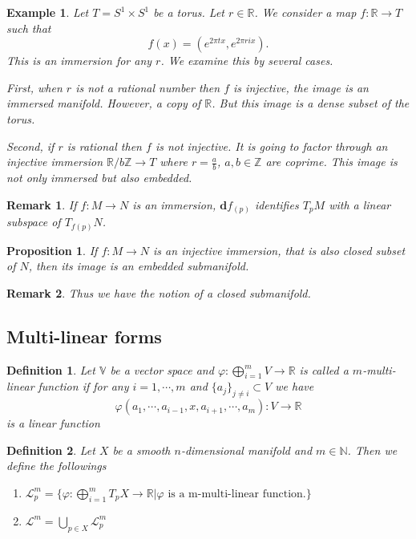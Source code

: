 \documentclass{article}
\newtheorem{proposition}{Proposition}[section]
\newtheorem{definition}{Definition}[section]
\newtheorem{remark}{Remark}[section]
\newtheorem{example}{Example}[section]
\numberwithin{equation}{section}
\begin{document}
\begin{example}
Let $T=S^1\times S^1$ be a torus. Let $r\in\mathbb{R}$. We consider a map $f:\mathbb{R}\to T$ such that
\begin{equation*}
f(x) = (e^{2\pi t x},e^{2\pi ri x}).
\end{equation*}
This is an immersion for any $r$. We examine this by several cases. \\
\par First, when $r$ is not a rational number then $f$ is injective, the image is an immersed manifold. However, a copy of $\mathbb{R}$. But this image is a dense subset of the torus. \\
\par Second, if $r$ is rational then $f$ is not injective. It is going to factor through an injective immersion $\mathbb{R}/b\mathbb{Z}\to T$ where $r={\frac a b}$, $a,b\in\mathbb{Z}$ are coprime. This image is not only immersed but also embedded. \\
\end{example}

\begin{remark}
If $f:M\to N$ is an immersion, $\mathbf{d}f_(p)$ identifies $T_pM$ with a linear subspace of $T_{f(p)}N$. 
\end{remark}

\begin{proposition}
If $f:M\to N$ is an injective immersion, that is also closed subset of $N$, then its image is an embedded submanifold. 
\end{proposition}

\begin{remark}
Thus we have the notion of a closed submanifold. 
\end{remark}

\subsection{Multi-linear forms}
\begin{definition}
Let $\mathbb{V}$ be a vector space and $\varphi:\bigoplus_{i=1}^mV\to\mathbb{R}$ is called a $m$-multi-linear function if for any $i=1,\cdots,m$ and $\{a_j\}_{j\not=i}\subset V$ we have
\begin{equation*}
\varphi(a_1,\cdots,a_{i-1},x,a_{i+1},\cdots,a_m):V\to\mathbb{R}
\end{equation*}
is a linear function
\end{definition}

\begin{definition}
Let $X$ be a smooth $n$-dimensional manifold and $m\in\mathbb{N}$. Then we define the followings
\begin{enumerate}
\item $\mathcal{L}^m_p=\{\varphi:\bigoplus_{i=1}^mT_pX\to\mathbb{R}|\varphi \text{ is a m-multi-linear function.}\}$
\item $\mathcal{L}^m=\bigcup_{p\in X}\mathcal{L}^m_p$
\end{enumerate}
\end{definition}
\end{document}
